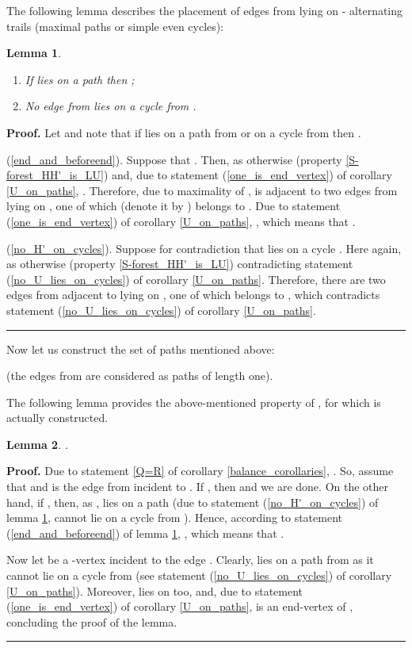 \documentclass[a4paper, 12pt]{article}
\newtheorem{lemma}{Lemma}[subsection]
\newenvironment{proof}[1][Proof]{\noindent\textbf{#1.} }{\ \rule{0.5em}{0.5em}}
\begin{document}
The following lemma describes the placement of edges from  lying
on - alternating trails (maximal paths or simple even cycles):
\begin{lemma} \label{H'on_paths}\
\renewcommand{\labelenumi}{(\arabic{enumi})}
\begin{enumerate}
\item \label{end_and_beforeend} If  lies on a path  then ;
\item \label{no_H'_on_cycles} No edge from  lies on a cycle from
.
\end{enumerate}
\end{lemma}
\begin{proof}
Let  and note that if  lies on a path from  or
on a cycle from  then .

(\ref{end_and_beforeend}). Suppose that . Then,  as otherwise  (property
\ref{S-forest_HH'_is_LU}) and, due to statement
(\ref{one_is_end_vertex}) of corollary \ref{U_on_paths}, . Therefore, due to maximality of ,  is adjacent to two
edges from  lying on , one of which (denote it by
) belongs to . Due to statement (\ref{one_is_end_vertex})
of corollary \ref{U_on_paths}, , which means that .

(\ref{no_H'_on_cycles}). Suppose for contradiction that  lies on
a cycle . Here again,  as otherwise  (property \ref{S-forest_HH'_is_LU}) contradicting
statement (\ref{no_U_lies_on_cycles}) of corollary \ref{U_on_paths}.
Therefore, there are two edges from  adjacent to 
lying on , one of which belongs to , which contradicts
statement (\ref{no_U_lies_on_cycles}) of corollary \ref{U_on_paths}.
\end{proof}

\bigskip

Now let us construct the set of paths  mentioned above:

(the edges from  are considered as paths
of length one).

The following lemma provides the above-mentioned property of ,
for which  is actually constructed.
\begin{lemma} \label{R_on_paths}
.
\end{lemma}
\begin{proof}
Due to statement \ref{Q=R} of corollary \ref{balance_corollaries},
. So, assume that  and  is the
edge from  incident to . If , then
 and we are done. On the other
hand, if , then, as ,  lies on a path  (due to statement (\ref{no_H'_on_cycles}) of lemma
\ref{H'on_paths},  cannot lie on a cycle from ). Hence,
according to statement (\ref{end_and_beforeend}) of lemma
\ref{H'on_paths}, , which means that .

Now let  be a -vertex incident to the edge . Clearly,  lies on a path from 
as it cannot lie on a cycle from  (see statement
(\ref{no_U_lies_on_cycles}) of corollary \ref{U_on_paths}).
Moreover,  lies on  too, and, due to statement
(\ref{one_is_end_vertex}) of corollary \ref{U_on_paths}, is an
end-vertex of , concluding the proof of the lemma.
\end{proof}
\end{document}
